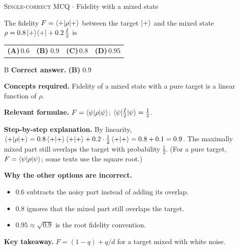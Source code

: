 \documentclass[11pt,a4paper]{article}
\newcommand{\optlabel}[1]{\textbf{(#1)}}
\newcommand{\correctlabel}[1]{\textcolor{okgreen}{\textbf{(#1)}\,\ding{51}}}
\newenvironment{qitem}[1]{\begin{list}{}{\setlength{\leftmargin}{3.3em}\setlength{\labelwidth}{3.1em}%
  \setlength{\labelsep}{0.2em}\setlength{\topsep}{3pt}\setlength{\parsep}{3pt}}\item[\textbf{Q.#1}\hfill]}{\end{list}}
\newcommand{\qsep}{\par\vspace{2pt}{\color{black!15}\hrule}\vspace{4pt}}
\newcommand{\qmeta}[2]{{\footnotesize\color{black!60}\textsc{#1} \;$\cdot$\; #2}\par}
\begin{document}
\begin{qitem}{10}
\qmeta{Single-correct MCQ}{Fidelity with a mixed state}
The fidelity $F = \braket{+|\rho|+}$ between the target $\ket+$ and the mixed state $\rho = 0.8\ket+\!\bra+ + 0.2\,\frac I2$ is
\par\smallskip\noindent\begin{tabularx}{\linewidth}{@{}*{4}{L}@{}}
\optlabel{A}\,$0.6$ & \correctlabel{B}\,$0.9$ & \optlabel{C}\,$0.8$ & \optlabel{D}\,$0.95$
\end{tabularx}
\end{qitem}
\begin{solbox}{B}
\textbf{\color{brand}Correct answer.} \textcolor{okgreen}{\textbf{(B)}} $0.9$

\textbf{\color{brand}Concepts required.} Fidelity of a mixed state with a pure target is a linear function of $\rho$.

\textbf{\color{brand}Relevant formulae.} $F = \braket{\psi|\rho|\psi}$; $\braket{\psi|\frac I2|\psi} = \frac12$.

\textbf{\color{brand}Step-by-step explanation.} By linearity, $\braket{+|\rho|+} = 0.8\braket{+|+}\braket{+|+} + 0.2\cdot\frac12\braket{+|+} = 0.8 + 0.1 = 0.9$.
The maximally mixed part still overlaps the target with probability $\frac12$. (For a pure target, $F = \braket{\psi|\rho|\psi}$; some texts use the square root.)

\textbf{\color{brand}Why the other options are incorrect.}
\begin{itemize}[leftmargin=2.4em, itemsep=1pt, topsep=2pt]
\item[\textbf{(A)}] $0.6$ subtracts the noisy part instead of adding its overlap.
\item[\textbf{(C)}] $0.8$ ignores that the mixed part still overlaps the target.
\item[\textbf{(D)}] $0.95 \approx \sqrt{0.9}$ is the root fidelity convention.
\end{itemize}
\textbf{\color{brand}Key takeaway.} $F = (1-q) + q/d$ for a target mixed with white noise.
\end{solbox}
\qsep
\end{document}
